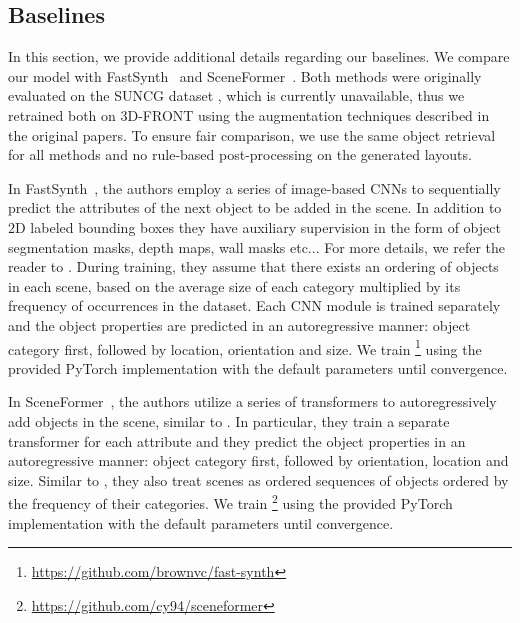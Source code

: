 \documentclass{article}
\makeatletter
\DeclareRobustCommand\onedot{\futurelet\@let@token\@onedot}
\def\@onedot{\ifx\@let@token.\else.\null\fi\xspace}
\def\etc{etc\onedot}
\newcommand{\boldparagraph}[1]{\vspace{0.2cm}\noindent{\bf #1:} }
\makeatother
\begin{document}
\subsection{Baselines}

In this section, we provide additional details regarding our baselines. We
compare our model with FastSynth~\cite{Ritchie2019CVPR} and
SceneFormer~\cite{Wang2020ARXIV}. Both methods were originally
evaluated on the SUNCG dataset \cite{Song2017CVPR}, which is currently
unavailable, thus we retrained both on 3D-FRONT using the augmentation
techniques described in the original papers. To ensure fair comparison, we use
the same object retrieval for all methods and no rule-based post-processing on
the generated layouts.

\boldparagraph{FastSynth}In FastSynth~\cite{Ritchie2019CVPR}, the authors employ a series of image-based
CNNs to sequentially predict the attributes of the next object to be added in
the scene. In addition to $2$D labeled bounding boxes they have auxiliary
supervision in the form of object segmentation masks, depth maps, wall masks
\etc. For more details, we refer the reader to \cite{Wang2018SIGGRAPH}. During
training, they assume that there exists an ordering of objects in each scene,
based on the average size of each category multiplied by its frequency of
occurrences in the dataset. Each CNN module is trained separately and the object
properties are predicted in an autoregressive manner: object category first,
followed by location, orientation and size. We train
\cite{Ritchie2019CVPR}\footnote{\href{https://github.com/brownvc/fast-synth}{https://github.com/brownvc/fast-synth}}
using the provided PyTorch \cite{Paszke2016ARXIV} implementation with the
default parameters until convergence.

\boldparagraph{SceneFormer}In SceneFormer~\cite{Wang2020ARXIV}, the authors utilize a series of
transformers to autoregressively add objects in the scene, similar to
\cite{Ritchie2019CVPR}. In particular, they train a separate transformer for
each attribute and they predict the object properties in an autoregressive
manner: object category first, followed by orientation, location and size.
Similar to \cite{Ritchie2019CVPR}, they also treat scenes as ordered sequences of
objects ordered by the frequency of their categories.
We train \cite{Wang2020ARXIV}\footnote{\href{https://github.com/cy94/sceneformer}{https://github.com/cy94/sceneformer}} using the provided PyTorch \cite{Paszke2016ARXIV} implementation with the
default parameters until convergence.
\end{document}
